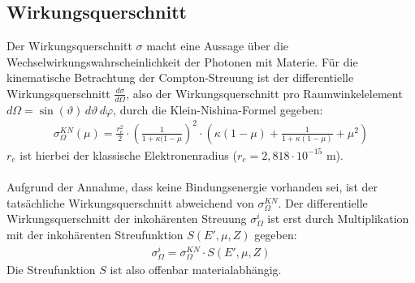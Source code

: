 \documentclass[german,  %
parskip=full,  %
]{scrartcl}
\begin{document}
\subsection{Wirkungsquerschnitt}
Der Wirkungsquerschnitt $\sigma$ macht eine Aussage über die Wechselwirkungswahrscheinlichkeit der Photonen mit Materie. Für die kinematische Betrachtung der Compton-Streuung ist der differentielle Wirkungsquerschnitt $\frac{d\sigma}{d\Omega}$, also der Wirkungsquerschnitt pro Raumwinkelelement $d\Omega = \sin(\vartheta) \, d\vartheta \, d\varphi$, durch die Klein-Nishina-Formel gegeben:
\begin{align}
\label{klein}
\sigma_{\Omega}^{KN}(\mu) = \frac{r_{e}^2}{2} \cdot \left(\frac{1}{1+\kappa(1-\mu}\right)^2 \cdot \left(\kappa(1-\mu)+\frac{1}{1+\kappa(1-\mu)}+\mu^2\right)
\end{align}
$r_{e}$ ist hierbei der klassische Elektronenradius ($r_{e} = 2,818 \cdot 10^{-15}$ m).
\\\\
Aufgrund der Annahme, dass keine Bindungsenergie vorhanden sei, ist der tatsächliche Wirkungsquerschnitt abweichend von $\sigma_{\Omega}^{KN}$. Der differentielle Wirkungsquerschnitt der inkohärenten Streuung $\sigma_{\Omega}^{i}$ ist erst durch Multiplikation mit der inkohärenten Streufunktion $S(E', \mu, Z)$ gegeben:
\begin{align}
\sigma_{\Omega}^{i} = \sigma_{\Omega}^{KN} \cdot  S(E', \mu, Z)
\end{align}
Die Streufunktion $S$ ist also offenbar materialabhängig.
\end{document}
